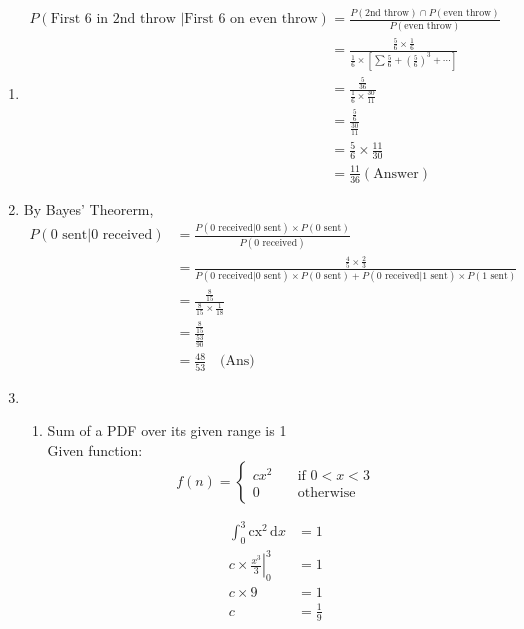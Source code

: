 \documentclass[a4paper, 12pt]{article}
\begin{document}
\begin{enumerate}
	\item 
	\begin{align*}
		P \left(\text{First 6 in 2nd throw }\right| 
		\left.\text{First 6 on even throw}\right)
		&= \frac{P\left(\text{2nd throw}\right)\cap
		P\left(\text{even throw}\right)}{P\left(
		\text{even throw}\right)}\\
		&= \frac{\frac{5}{6}\times\frac{1}{6}}
		{\frac{1}{6}\times\left[\sum \frac{5}{6}
		+ \left(\frac{5}{6}\right)^3 + \cdots\right]}\\
		&= \frac{\frac{5}{36}}{\frac{1}{6}\times
		\frac{30}{11}}\\
		&= \frac{\frac{5}{6}}{\frac{30}{11}}\\
		&= \frac{5}{6} \times \frac{11}{30}\\
		&= \frac{11}{36} \left(\text{Answer}\right)
	\end{align*}
	
	\item By Bayes' Theorerm,\\
	\begin{align*}
		P( 0\text{ sent}|0 \text{ received})
		&= \frac{P(0\text{ received}|0 \text{ sent}
		)\times P(0\text{ sent}) }
		{P(0\text{ received})}\\		
		&= \frac{\frac{4}{5}\times\frac{2}{3}}
		{P(0\text{ received}|0\text{ sent})\times
		P(0\text{ sent}) + P(0\text{ received}|
		1\text{ sent})\times P(1\text{ sent})}\\
		&= \frac{\frac{8}{15}}{\frac{8}{15}\times
		\frac{1}{18}}\\
		&= \frac{\frac{8}{15}}{\frac{53}{90}}\\
		&= \frac{48}{53} \quad\text{(Ans)}
	\end{align*}
	
	\item 
	
	\begin{enumerate}
		\item
		Sum of a PDF over its given range is 1\\
		Given function:
		\[ f(n) = 
			\begin{cases}
				cx^2 & \quad \text{if } 0 < x < 3 \\
				0 & \quad \text{otherwise}
			\end{cases}
		\]
	
		\begin{align*}
			\int_{0}^{3} \mathrm{cx^2}\,\mathrm{d}x &= 1\\
			c\times\left.\frac{x^3}{3}\right|_{0}^{3} &= 1\\
			c\times 9 &= 1\\
			c &= \frac{1}{9}
		\end{align*}
	

\end{enumerate}
\end{enumerate}
\end{document}
